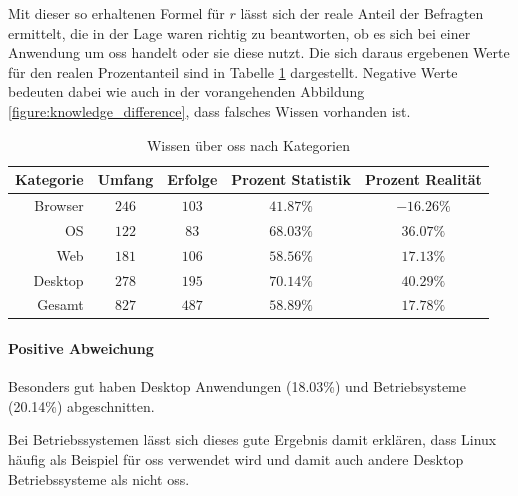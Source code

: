 \documentclass[a4paper]{article}
\begin{document}
                Mit dieser so erhaltenen Formel für $r$ lässt sich der reale Anteil der Befragten ermittelt, die in der Lage waren richtig zu beantworten, ob es sich bei einer Anwendung um \gls{oss} handelt oder sie diese nutzt. Die sich daraus ergebenen Werte für den realen Prozentanteil sind in Tabelle \ref{table:knowledge_by_category} dargestellt. Negative Werte bedeuten dabei wie auch in der vorangehenden Abbildung \ref{figure:knowledge_difference}, dass falsches Wissen vorhanden ist.
                
                
                \begin{table}
                    \centering
                    \begin{tabular}{rcccc}
                        Kategorie & Umfang & Erfolge & Prozent Statistik & Prozent Realität \\\hline\hline
                        Browser & $246$ & $103$ & $41.87\%$ & $-16.26\%$\\
                        OS & $122$ & $83$ & $68.03\%$ & $36.07\%$\\
                        Web & $181$ & $106$ & $58.56\%$ & $17.13\%$\\
                        Desktop & $278$ & $195$ & $70.14\%$ & $40.29\%$\\\hline
                        Gesamt & $827$ & $487$ & $58.89\%$ & $17.78\%$
                    \end{tabular}
                    \caption{Wissen über \gls{oss} nach Kategorien}
                    \label{table:knowledge_by_category}
                \end{table}
                
                \paragraph{Positive Abweichung}
                    Besonders gut haben Desktop Anwendungen ({\scriptsize 18.03\%}) und Betriebsysteme ({\scriptsize 20.14\%}) abgeschnitten.
                    
                    Bei Betriebssystemen lässt sich dieses gute Ergebnis damit erklären, dass Linux häufig als Beispiel für \gls{oss} verwendet wird und damit auch andere Desktop Betriebssysteme als nicht \gls{oss}.%
                    
                
\end{document}
